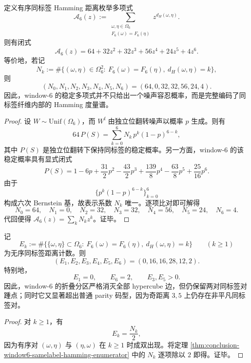 \begin{theorem}\label{thm:conclusion-window6-samelabel-hamming-enumerator}
定义有序同标签 Hamming 距离枚举多项式
\[
\mathcal A_6(z):=
\sum_{\substack{\omega,\eta\in\Omega_6\\ F_6(\omega)=F_6(\eta)}} z^{d_H(\omega,\eta)}.
\]
则有闭式
\[
\mathcal A_6(z)=64+32z^2+32z^3+56z^4+24z^5+4z^6.
\]
等价地，若记
\[
N_k:=\#\{(\omega,\eta)\in \Omega_6^2:\ F_6(\omega)=F_6(\eta),\ d_H(\omega,\eta)=k\},
\]
则
\[
(N_0,N_1,N_2,N_3,N_4,N_5,N_6)=(64,0,32,32,56,24,4).
\]
因此，window-\(6\) 的稳定多项式并不只给出一个噪声容忍概率，而是完整编码了同标签纤维内部的 Hamming 度量谱。
\end{theorem}
\begin{proof}
设 \(W\sim \mathrm{Unif}(\Omega_6)\)，而 \(W^{\mathrm f}\) 由独立位翻转噪声以概率 \(p\) 生成。则有
\[
64\,P(S)
=
\sum_{k=0}^{6}N_k\,p^k(1-p)^{6-k},
\]
其中 \(P(S)\) 是独立位翻转下保持同标签的稳定概率。另一方面，window-\(6\) 的该稳定概率具有显式闭式
\[
P(S)=1-6p+\frac{31}{2}p^2-\frac{43}{2}p^3+\frac{139}{8}p^4-\frac{63}{8}p^5+\frac{25}{16}p^6.
\]
由于
\[
\{p^k(1-p)^{6-k}\}_{k=0}^{6}
\]
构成六次 Bernstein 基，故表示系数 \(N_k\) 唯一。逐项比对即可解得
\[
N_0=64,\quad N_1=0,\quad N_2=32,\quad N_3=32,\quad N_4=56,\quad N_5=24,\quad N_6=4.
\]
代回便得 \(\mathcal A_6(z)=\sum_k N_k z^k\)。证毕。
\end{proof}

\begin{corollary}\label{cor:conclusion-window6-edge-separation-antipodal-residue}
记
\[
E_k:=\#\bigl\{\{\omega,\eta\}\subset \Omega_6:\ F_6(\omega)=F_6(\eta),\ d_H(\omega,\eta)=k\bigr\}
\qquad (k\ge 1)
\]
为无序同标签距离计数。则
\[
(E_1,E_2,E_3,E_4,E_5,E_6)=(0,16,16,28,12,2).
\]
特别地，
\[
E_1=0,
\qquad
E_6=2,
\qquad
E_3,E_5>0.
\]
因此，window-\(6\) 的折叠分区严格消灭全部 hypercube 边，但仍保留两对同标签对踵点；同时它又显著超出普通 parity 码型，因为奇距离 \(3,5\) 上仍存在非平凡同标签对。
\end{corollary}
\begin{proof}
对 \(k\ge 1\)，有
\[
E_k=\frac{N_k}{2},
\]
因为有序对 \((\omega,\eta)\) 与 \((\eta,\omega)\) 在 \(k\ge 1\) 时成双出现。将定理 \ref{thm:conclusion-window6-samelabel-hamming-enumerator} 中的 \(N_k\) 逐项除以 \(2\) 即得。证毕。
\end{proof}

